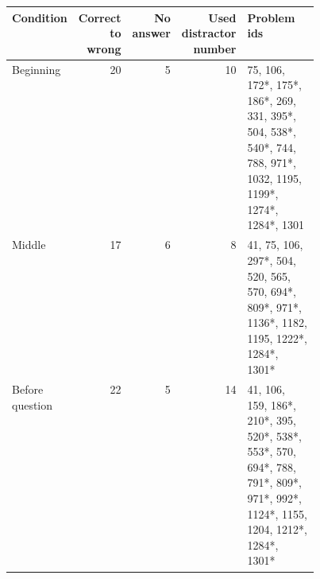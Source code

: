 \begin{tabular}{lrrrp{0.45\linewidth}}
\toprule
Condition & Correct to wrong & No answer & Used distractor number & Problem ids \\
\midrule
Beginning & 20 & 5 & 10 & 75, 106, 172*, 175*, 186*, 269, 331, 395*, 504, 538*, 540*, 744, 788, 971*, 1032, 1195, 1199*, 1274*, 1284*, 1301 \\
Middle & 17 & 6 & 8 & 41, 75, 106, 297*, 504, 520, 565, 570, 694*, 809*, 971*, 1136*, 1182, 1195, 1222*, 1284*, 1301* \\
Before question & 22 & 5 & 14 & 41, 106, 159, 186*, 210*, 395, 520*, 538*, 553*, 570, 694*, 788, 791*, 809*, 971*, 992*, 1124*, 1155, 1204, 1212*, 1284*, 1301* \\
\bottomrule
\end{tabular}
